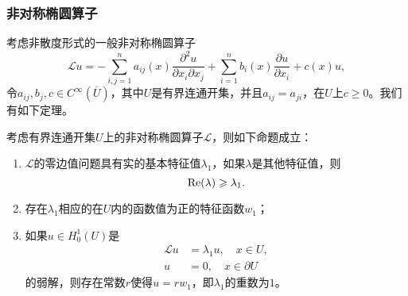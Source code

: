 \documentclass[a4paper,10pt]{ctexart}
\begin{document}
\subsubsection{非对称椭圆算子}
考虑非散度形式的一般非对称椭圆算子
\[
    \mathcal{L}u = -\sum_{i,j=1}^n a_{ij}(x) \dfrac{\partial^2 u}{\partial x_i \partial x_j} + \sum_{i=1}^n b_i(x) \dfrac{\partial u}{\partial x_i} + c(x)u,
\]
令$ a_{ij},b_j,c\in C^\infty(\overline{U}) $，其中$ U $是有界连通开集，并且$ a_{ij} = a_{ji} $，在$ U $上$ c\geqslant 0 $。我们有如下定理。
\begin{theorem}
    考虑有界连通开集$ U $上的非对称椭圆算子$ \mathcal{L} $，则如下命题成立：
    \begin{enumerate}
        \item $ \mathcal{L} $的零边值问题具有实的基本特征值$ \lambda_1 $，如果$ \lambda $是其他特征值，则
        \begin{equation}
            {\rm Re}(\lambda) \geqslant \lambda_1.
        \end{equation}
        \item 存在$ \lambda_1 $相应的在$ U $内的函数值为正的特征函数$ w_1 $；
        \item 如果$ u\in H^1_0(U) $是
        \[
            \begin{aligned}
                \mathcal{L}u &= \lambda_1 u, \quad x\in  U,\\
                u &= 0, \quad x\in \partial U
            \
            \end{aligned}
        \]
        的弱解，则存在常数$ r $使得$ u = rw_1 $，即$ \lambda_1 $的重数为$ 1 $。
    \end{enumerate}
\end{theorem}
\end{document}
